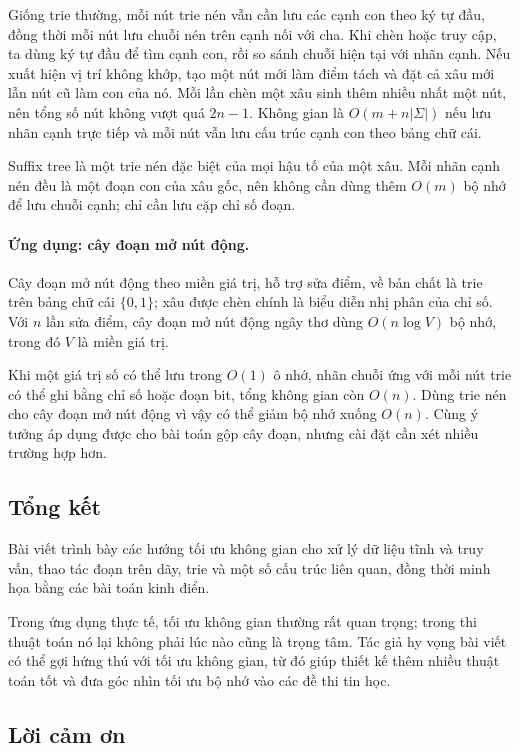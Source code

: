 \documentclass[11pt]{article}
\begin{document}
Giống trie thường, mỗi nút trie nén vẫn cần lưu các cạnh con theo ký tự đầu,
đồng thời mỗi nút lưu chuỗi nén trên cạnh nối với cha. Khi chèn hoặc truy cập,
ta dùng ký tự đầu để tìm cạnh con, rồi so sánh chuỗi hiện tại với nhãn cạnh.
Nếu xuất hiện vị trí không khớp, tạo một nút mới làm điểm tách và đặt cả xâu
mới lẫn nút cũ làm con của nó. Mỗi lần chèn một xâu sinh thêm nhiều nhất một
nút, nên tổng số nút không vượt quá $2n-1$. Không gian là
$O(m+n|\Sigma|)$ nếu lưu nhãn cạnh trực tiếp và mỗi nút vẫn lưu cấu trúc cạnh
con theo bảng chữ cái.

Suffix tree là một trie nén đặc biệt của mọi hậu tố của một xâu. Mỗi nhãn cạnh
nén đều là một đoạn con của xâu gốc, nên không cần dùng thêm $O(m)$ bộ nhớ để
lưu chuỗi cạnh; chỉ cần lưu cặp chỉ số đoạn.

\paragraph{Ứng dụng: cây đoạn mở nút động.}
Cây đoạn mở nút động theo miền giá trị, hỗ trợ sửa điểm, về bản chất là trie
trên bảng chữ cái $\{0,1\}$; xâu được chèn chính là biểu diễn nhị phân của chỉ
số. Với $n$ lần sửa điểm, cây đoạn mở nút động ngây thơ dùng
$O(n\log V)$ bộ nhớ, trong đó $V$ là miền giá trị.

Khi một giá trị số có thể lưu trong $O(1)$ ô nhớ, nhãn chuỗi ứng với mỗi nút
trie có thể ghi bằng chỉ số hoặc đoạn bit, tổng không gian còn $O(n)$. Dùng
trie nén cho cây đoạn mở nút động vì vậy có thể giảm bộ nhớ xuống $O(n)$. Cùng
ý tưởng áp dụng được cho bài toán gộp cây đoạn, nhưng cài đặt cần xét nhiều
trường hợp hơn.

\subsection{Tổng kết}

Bài viết trình bày các hướng tối ưu không gian cho xử lý dữ liệu tĩnh và truy
vấn, thao tác đoạn trên dãy, trie và một số cấu trúc liên quan, đồng thời minh
họa bằng các bài toán kinh điển.

Trong ứng dụng thực tế, tối ưu không gian thường rất quan trọng; trong thi thuật
toán nó lại không phải lúc nào cũng là trọng tâm. Tác giả hy vọng bài viết có
thể gợi hứng thú với tối ưu không gian, từ đó giúp thiết kế thêm nhiều thuật
toán tốt và đưa góc nhìn tối ưu bộ nhớ vào các đề thi tin học.

\subsection*{Lời cảm ơn}
\end{document}

